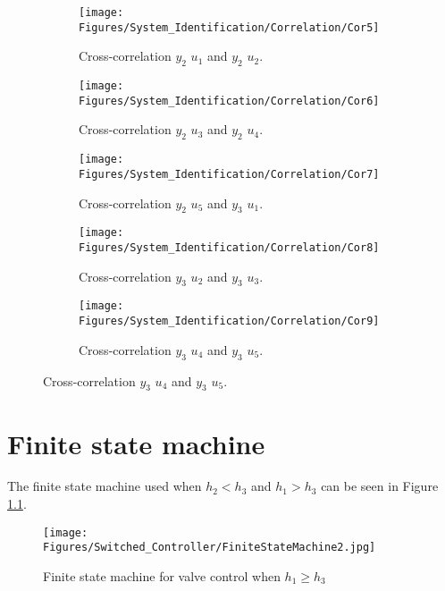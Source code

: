 \begin{figure}[H]
\begin{center}
	\begin{subfigure}{0.49\textwidth} 	
    \texttt{[image: Figures/System\_Identification/Correlation/Cor5]}
	\caption{Cross-correlation $y_2$ $u_1$ and $y_2$ $u_2$.}
	\end{subfigure} 	
	\begin{subfigure}{0.49\textwidth}
    \texttt{[image: Figures/System\_Identification/Correlation/Cor6]}
    \caption{Cross-correlation $y_2$ $u_3$ and $y_2$ $u_4$.}
	\end{subfigure}
\end{center}
\begin{center}
	\begin{subfigure}{0.49\textwidth} 	
    \texttt{[image: Figures/System\_Identification/Correlation/Cor7]}
    \caption{Cross-correlation $y_2$ $u_5$ and $y_3$ $u_1$.}
	\end{subfigure} 	
	\begin{subfigure}{0.49\textwidth}
    \texttt{[image: Figures/System\_Identification/Correlation/Cor8]}
    \caption{Cross-correlation $y_3$ $u_2$ and $y_3$ $u_3$.}
	\end{subfigure}
\end{center}
\begin{center}
	\begin{subfigure}{0.49\textwidth} 	
    \texttt{[image: Figures/System\_Identification/Correlation/Cor9]}
    \caption{Cross-correlation $y_3$ $u_4$ and $y_3$ $u_5$.}
	\end{subfigure} 	
\end{center}
\end{figure}


\chapter{Finite state machine} \label{App:FSM}
The finite state machine used when $h_2<h_3$ and $h_1>h_3$ can be seen in Figure \ref{fig:FSM2}.

\begin{figure} [H]
  \begin{center}
    \texttt{[image: Figures/Switched\_Controller/FiniteStateMachine2.jpg]}
    \caption{Finite state machine for valve control when $h_1\geq h_3$}
    \label{fig:FSM2}
  \end{center}
\end{figure}


